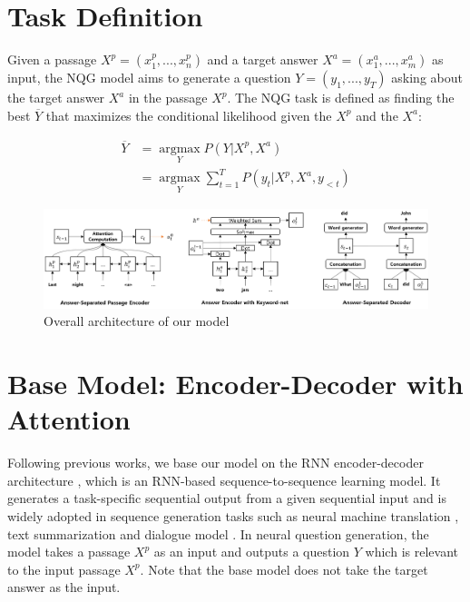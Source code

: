 \documentclass[letterpaper]{article} %
\begin{document}
\section{Task Definition}
Given a passage \(X^p = (x^p_1, ...,x^p_n)\) and a target answer \(X^a = (x^a_1, ..., x^a_m)\) as input, the NQG model aims to generate a question \(Y = (y_1, ...,y_T)\) asking about the target answer \(X^a\) in the passage \(X^p \). The NQG task is defined as finding the best \(\overline{Y}\) that maximizes the conditional likelihood given the \(X^p\) and the \(X^a\):

\begin{align}
\overline{Y} &= \underset{Y}{\operatorname{argmax}} P(Y|X^p, X^a) \label{eq_1} \\
& = \underset{Y}{\operatorname{argmax}} \sum_{t=1}^{T} P(y_t|X^p, X^a, y_{<t}) \label{eq_2}
\end{align}

\begin{figure}[!htb]
	\centering
  	\includegraphics[width = \textwidth ]{overall_architecture.png}
	\caption{Overall architecture of our model}
  	\label{fig:overall_architecture}
\end{figure}


\section{Base Model: Encoder-Decoder with Attention}
Following previous works, we base our model on the RNN encoder-decoder architecture \cite{sutskever2014sequence}, which is an RNN-based sequence-to-sequence learning model. It generates a task-specific sequential output from a given sequential input and is widely adopted in sequence generation tasks such as neural machine translation \cite{sutskever2014sequence,bahdanau2014neural}, text summarization \cite{nallapati2016abstractive} and dialogue model \cite{serban2016building,serban2017hierarchical}. In neural question generation, the model takes a passage \(X^p \) as an input and outputs a question \(Y\) which is relevant to the input passage \(X^p\). Note that the base model does not take the target answer as the input.
\end{document}
